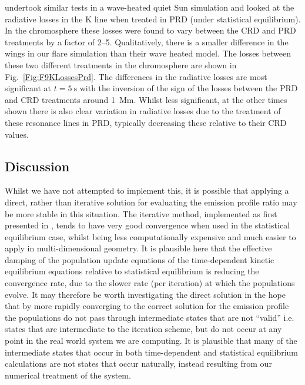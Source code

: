 \citet{Uitenbroek2002} undertook similar tests in a wave-heated quiet Sun \Radyn{} simulation and looked at the radiative losses in the \Caii{} K line when treated in PRD (under statistical equilibrium).
In the chromosphere these losses were found to vary between the CRD and PRD treatments by a factor of 2--5.
Qualitatively, there is a smaller difference in the \Caii{} wings in our flare simulation than their wave heated model.
The losses between these two different treatments in the chromosphere are shown in Fig.~\ref{Fig:F9KLossesPrd}.
The differences in the radiative losses are most significant at $t=\SI{5}{\second}$ with the inversion of the sign of the losses between the PRD and CRD treatments around \SI{1}{\mega\metre}.
Whilst less significant, at the other times shown there is also clear variation in radiative losses due to the treatment of these \Caii{} resonance lines in PRD, typically decreasing these relative to their CRD values.

\subsection{Discussion}

Whilst we have not attempted to implement this, it is possible that applying a direct, rather than iterative solution for evaluating the emission profile ratio may be more stable in this situation.
The iterative method, implemented as first presented in \citet{Uitenbroek2001}, tends to have very good convergence when used in the statistical equilibrium case, whilst being less computationally expensive and much easier to apply in multi-dimensional geometry.
It is plausible here that the effective damping of the population update equations of the time-dependent kinetic equilibrium equations relative to statistical equilibrium is reducing the convergence rate, due to the slower rate (per iteration) at which the populations evolve.
It may therefore be worth investigating the direct solution in the hope that by more rapidly converging to the correct solution for the emission profile the populations do not pass through intermediate states that are not ``valid'' i.e. states that are intermediate to the iteration scheme, but do not occur at any point in the real world system we are computing.
It is plausible that many of the intermediate states that occur in both time-dependent and statistical equilibrium calculations are not states that occur naturally, instead resulting from our numerical treatment of the system.

